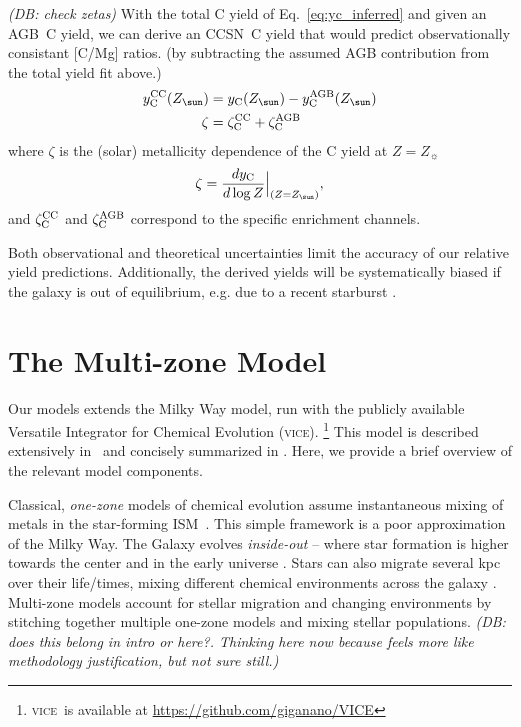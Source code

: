 \documentclass[fleqn,
usenatbib]{mnras}
\newcommand{\JJ}{\citetalias{james+21}}
\newcommand{\VICE}{\textsc{vice}}
\newcommand{\agb}{AGB}
\newcommand{\cc}{CCSN}
\newcommand{\Yct}{{y_{\rm C}}}
\newcommand{\Ycc}{{y_{\rm C}^{\rm CC}}}
\newcommand{\Ycagb}{{y_{\rm C}^{\rm AGB}}}
\newcommand{\zagb}{\zeta_{\rm C}^{\rm AGB}}
\newcommand{\zcc}{\zeta_{\rm C}^{\rm CC}}
\newcommand{\Zo}{ Z_{\sun}}
\newcommand{\note}[1]{{\color{ForestGreen} \textit{ \small (JWJ: #1)}}}
\newcommand{\dbnote}[1]{ {\color{Thistle} \textit{\small (DB: #1)}} }
\begin{document}
\dbnote{check zetas}
With the total C yield of Eq.~\ref{eq:yc_inferred} and given an \agb\ C yield, we can derive an \cc\ C yield that would predict observationally consistant [C/Mg] ratios.
(by subtracting the assumed AGB contribution from the total yield fit above.)
\begin{subequations}
    \begin{align}
        \Ycc(\Zo) &= \Yct(\Zo) - \Ycagb(\Zo)\\
        \zeta &= \zcc + \zagb
    \end{align}
\end{subequations}
where $\zeta$ is the (solar) metallicity dependence of the C yield at $Z=\Zo$
\begin{equation}
    \zeta = \frac{d y_{\rm C}}{d \log Z} \Big \vert_{(Z=\Zo)},
\end{equation}
and $\zcc$ and $\zagb$ correspond to the specific enrichment channels. 

Both observational and theoretical uncertainties limit the accuracy of our relative yield predictions. Additionally, the derived yields will be systematically biased if the galaxy is out of equilibrium, e.g. due to a recent starburst \citep{mor+19,isern19}. 


\section{The Multi-zone Model}\label{sec:vice}

Our models extends the \citet[hereafter \JJ]{james+21} Milky Way model, run with the publicly available Versatile Integrator for Chemical Evolution (\VICE).%
    \footnote{\VICE~is available at \url{https://github.com/giganano/VICE}}
This model is described extensively in \JJ~and concisely summarized  in \citet{james+23}. Here, we provide a brief overview of the relevant model components.

Classical, \textit{one-zone} models of chemical evolution assume instantaneous mixing of metals in the star-forming ISM\ \citep[e.g.][]{matteucci21}. This simple framework is a poor approximation of the Milky Way.  The Galaxy evolves \textit{inside-out} -- where star formation is higher towards the center and in the early universe \citep{WF91, kauffmann96, bird+13}. Stars can also migrate several kpc over their life/times, mixing different chemical environments across the galaxy \citep{bird+12,sellwood+binney02}. Multi-zone models account for stellar migration and changing environments by stitching together multiple one-zone models and mixing stellar populations. \dbnote{does this belong in intro or here?. Thinking here now because feels more like methodology justification, but not sure still.}
\end{document}
